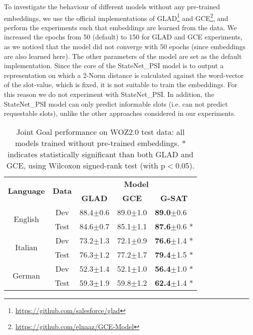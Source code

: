 \documentclass{article}
\begin{document}
To investigate the behaviour of different models  without any pre-trained embeddings, we use the official implementations of GLAD\footnote{\url{https://github.com/salesforce/glad}} and GCE\footnote{\url{https://github.com/elnaaz/GCE-Model}}, and perform the experiments such that embeddings are learned from the data.
We increased the epochs from 50 (default) to 150 for GLAD and GCE experiments, as we noticed that the model did not converge with 50 epochs (since embeddings are also learned here).
The other parameters of the model are set as the default implementation.
Since the core of the StateNet\_PSI model is to output a representation on which a 2-Norm distance is calculated against the word-vector of the slot-value, which is fixed, it is not suitable to train the embeddings.
For this reason we do not experiment with StateNet\_PSI.
In addition, the StateNet\_PSI model can only predict informable slots (i.e. can not predict requestable slots), unlike the other approaches considered in our experiments.

\begin{table}
    \centering
    \begin{tabular}{c|c|c|c|l}
        \multirow{2}{*}{\textbf{Language}} & \multirow{2}{*}{\textbf{Data}} & \multicolumn{3}{c}{\textbf{Model}}\\
& & \textbf{GLAD} & \textbf{GCE} & \multicolumn{1}{c}{\textbf{G-SAT}}\\
        \hline
        \multirow{2}{*}{English} &  Dev & 88.4$\pm$0.6 & 89.0$\pm$1.0 & \textbf{89.0}$\pm$0.6 \\
        \cline{2-5}
        & Test & 84.6$\pm$0.7 & 85.1$\pm$1.1 & \textbf{87.6}$\pm$0.6 * \\
        \hline
        \multirow{2}{*}{Italian} &  Dev & 73.2$\pm$1.3 & 72.1$\pm$0.9 & \textbf{76.6}$\pm$1.4 * \\
        \cline{2-5}
        & Test & 76.3$\pm$1.2 & 77.2$\pm$1.7 & \textbf{79.4}$\pm$1.5 * \\
        \hline
        \multirow{2}{*}{German} &  Dev & 52.3$\pm$1.4 & 52.1$\pm$1.0 & \textbf{56.4}$\pm$1.0 * \\
        \cline{2-5}
        & Test & 59.3$\pm$1.9 & 59.8$\pm$1.2 & \textbf{62.4}$\pm$1.4 * \\
        \hline
    \end{tabular}
    \caption{Joint Goal performance on WOZ2.0 test data: all models trained without pre-trained embeddings. * indicates statistically significant \cite{reimers-gurevych-2017-reporting} than both GLAD and GCE, using Wilcoxon signed-rank test (with p$<$0.05).}
    \label{tab:result}
\end{table}
\end{document}
